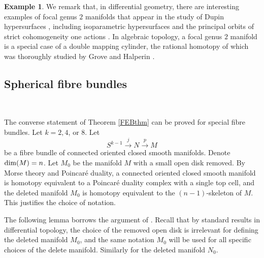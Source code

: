 \documentclass[a4]{amsart}
\theoremstyle{definition}
\newtheorem{example}[theorem]{Example}
\begin{document}
\begin{sloppypar}
\begin{example}
We remark that, in differential geometry, there are interesting examples of focal genus $2$ manifolds that appear in the study of Dupin hypersurfaces \cite{Tho83}, including isoparametric hypersurfaces \cite{Mun80, Heb81} and the principal orbits of strict cohomogeneity one actions \cite{Mos57}. 
In algebraic topology, a focal genus $2$ manifold is a special case of a double mapping cylinder, the rational homotopy of which was thoroughly studied by Grove and Halperin \cite{GH87}.
\end{example}


\subsection{Spherical fibre bundles}
\label{subsec: Sfib}

$\, $

The converse statement of Theorem \ref{FEBthm} can be proved for special fibre bundles. 
Let $k=2, 4$, or $8$.  
Let 
\begin{equation}\label{SNMeq}
S^{k-1}\stackrel{j}{\longrightarrow} N\stackrel{p}{\longrightarrow} M
\end{equation}
be a fibre bundle of connected oriented closed smooth manifolds. Denote ${\rm dim}(M)=n$. 
Let $M_0$ be the manifold $M$ with a small open disk removed. By Morse theory and Poincar\'{e} duality, a connected oriented closed smooth manifold is homotopy equivalent to a Poincar\'{e} duality complex with a single top cell, and the deleted manifold $M_0$ is homotopy equivalent to the $(n-1)$-skeleton of $M$. This justifies the choice of notation.  

The following lemma borrows the argument of \cite[Lemma 3.1]{HT23}. 
Recall that by standard results in differential topology, the choice of the removed open disk is irrelevant for defining the deleted manifold $M_0$, and the same notation $M_0$ will be used for all specific choices of the delete manifold. Similarly for the deleted manifold $N_0$. 


\end{sloppypar}
\end{document}
